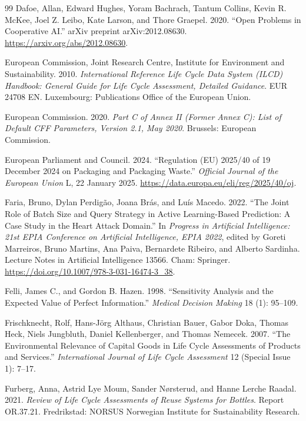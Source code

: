 \begin{thebibliography}{99}
Dafoe, Allan, Edward Hughes, Yoram Bachrach, Tantum Collins, Kevin R. McKee, Joel Z. Leibo, Kate Larson, and Thore Graepel. 2020. ``Open Problems in Cooperative AI.'' arXiv preprint arXiv:2012.08630. \url{https://arxiv.org/abs/2012.08630}.

European Commission, Joint Research Centre, Institute for Environment and Sustainability. 2010. \emph{International Reference Life Cycle Data System (ILCD) Handbook: General Guide for Life Cycle Assessment, Detailed Guidance}. EUR 24708 EN. Luxembourg: Publications Office of the European Union.

European Commission. 2020. \emph{Part C of Annex II (Former Annex C): List of Default CFF Parameters, Version 2.1, May 2020}. Brussels: European Commission.

European Parliament and Council. 2024. ``Regulation (EU) 2025/40 of 19 December 2024 on Packaging and Packaging Waste.'' \emph{Official Journal of the European Union} L, 22 January 2025. \url{https://data.europa.eu/eli/reg/2025/40/oj}.

Faria, Bruno, Dylan Perdig\~ao, Joana Br\'as, and Lu\'is Macedo. 2022. ``The Joint Role of Batch Size and Query Strategy in Active Learning-Based Prediction: A Case Study in the Heart Attack Domain.'' In \emph{Progress in Artificial Intelligence: 21st EPIA Conference on Artificial Intelligence, EPIA 2022}, edited by Goreti Marreiros, Bruno Martins, Ana Paiva, Bernardete Ribeiro, and Alberto Sardinha. Lecture Notes in Artificial Intelligence 13566. Cham: Springer. \url{https://doi.org/10.1007/978-3-031-16474-3_38}.

Felli, James C., and Gordon B. Hazen. 1998. ``Sensitivity Analysis and the Expected Value of Perfect Information.'' \emph{Medical Decision Making} 18 (1): 95--109.

Frischknecht, Rolf, Hans-J\"org Althaus, Christian Bauer, Gabor Doka, Thomas Heck, Niels Jungbluth, Daniel Kellenberger, and Thomas Nemecek. 2007. ``The Environmental Relevance of Capital Goods in Life Cycle Assessments of Products and Services.'' \emph{International Journal of Life Cycle Assessment} 12 (Special Issue 1): 7--17.

Furberg, Anna, Astrid Lye Moum, Sander N{\o}rsterud, and Hanne Lerche Raadal. 2021. \emph{Review of Life Cycle Assessments of Reuse Systems for Bottles}. Report OR.37.21. Fredrikstad: NORSUS Norwegian Institute for Sustainability Research.


\end{thebibliography}
